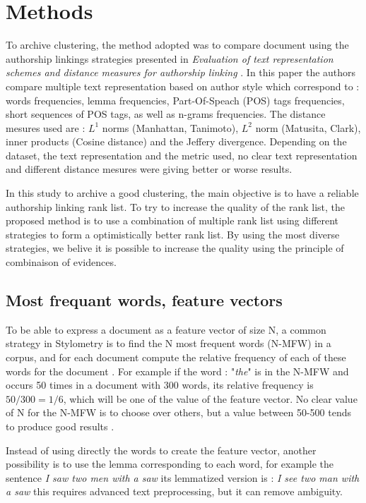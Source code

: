 \section{Methods \label{sec:methods}}

To archive clustering, the method adopted was to compare document using the authorship linkings strategies presented in \textit{Evaluation of text representation schemes and distance measures for authorship linking} \cite{kocher_verification}.
In this paper the authors compare multiple text representation based on author style which correspond to : words frequencies, lemma frequencies, Part-Of-Speach (POS) tags frequencies, short sequences of POS tags, as well as n-grams frequencies.
The distance mesures used are : $L^1$ norms (Manhattan, Tanimoto), $L^2$ norm (Matusita, Clark), inner products (Cosine distance) and the Jeffery divergence.
Depending on the dataset, the text representation and the metric used, no clear text representation and different distance mesures were giving better or worse results.

In this study to archive a good clustering, the main objective is to have a reliable authorship linking rank list.
To try to increase the quality of the rank list, the proposed method is to use a combination of multiple rank list using different strategies to form a optimistically better rank list.
By using the most diverse strategies, we belive it is possible to increase the quality using the principle of combinaison of evidences.

\subsection{Most frequant words, feature vectors}

To be able to express a document as a feature vector of size N, a common strategy in Stylometry is to find the N most frequent words (N-MFW) in a corpus, and for each document compute the relative frequency of each of these words for the document \cite{savoy_stylo}.
For example if the word : "\textit{the}" is in the N-MFW and occurs 50 times in a document with 300 words, its relative frequency is $50/300 = 1/6$, which will be one of the value of the feature vector.
No clear value of N for the N-MFW is to choose over others, but a value between 50-500 tends to produce good results \cite{savoy_text_representation}.

Instead of using directly the words to create the feature vector, another possibility is to use the lemma corresponding to each word, for example the sentence \textit{I saw two men with a saw} its lemmatized version is : \textit{I see two man with a saw} this requires advanced text preprocessing, but it can remove ambiguity.

